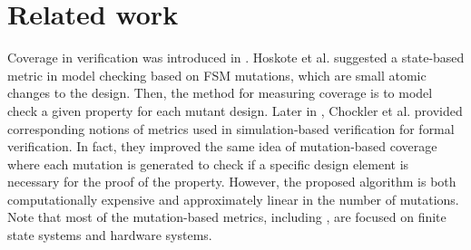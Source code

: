 \section{Related work}
\label{sec:related}




Coverage in verification was introduced in \cite{hoskote1999coverage, katz1999have}. Hoskote et al. \cite{hoskote1999coverage} suggested a state-based metric in model checking based on FSM mutations, which are small atomic changes to the design. Then, the method for measuring coverage is to model check a given property for each mutant design.
Later in \cite{chockler_coverage_2003}, Chockler et al. provided corresponding notions of metrics used in simulation-based verification for formal verification. In fact, they improved the same idea of mutation-based coverage where each mutation is generated to check if a specific
design element is necessary for the proof of the property.
 However, the proposed algorithm is both computationally expensive and approximately linear
 in the number of mutations. Note that most of the mutation-based metrics, including \cite{kupferman_theory_2008, chockler2001practical}, are focused on finite state systems and hardware systems.

